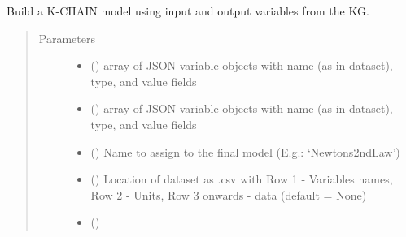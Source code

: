 \documentclass[letterpaper,10pt,english]{sphinxmanual}
\begin{document}
\begin{fulllineitems}
\begin{fulllineitems}
\begin{quote}
\begin{description}
\end{description}\end{quote}

\end{fulllineitems}


\begin{fulllineitems}
\label{\detokenize{index:kChain.kChainModel.build}}
Build a K-CHAIN model using input and output variables from the KG.
\begin{quote}\begin{description}
\item[{Parameters}] \leavevmode\begin{itemize}
\item {} 
 () \textendash{} array of JSON variable objects with name (as in dataset), type, and value fields

\item {} 
 () \textendash{} array of JSON variable objects with name (as in dataset), type, and value fields

\item {} 
 () \textendash{} Name to assign to the final model (E.g.: ‘Newtons2ndLaw’)

\item {} 
 () \textendash{} Location of dataset as .csv with Row 1 - Variables names,
Row 2 - Units, Row 3 onwards - data (default = None)

\item {} 
 () \textendash{} 

\end{itemize}

\end{description}\end{quote}


\end{fulllineitems}
\end{fulllineitems}
\end{document}
